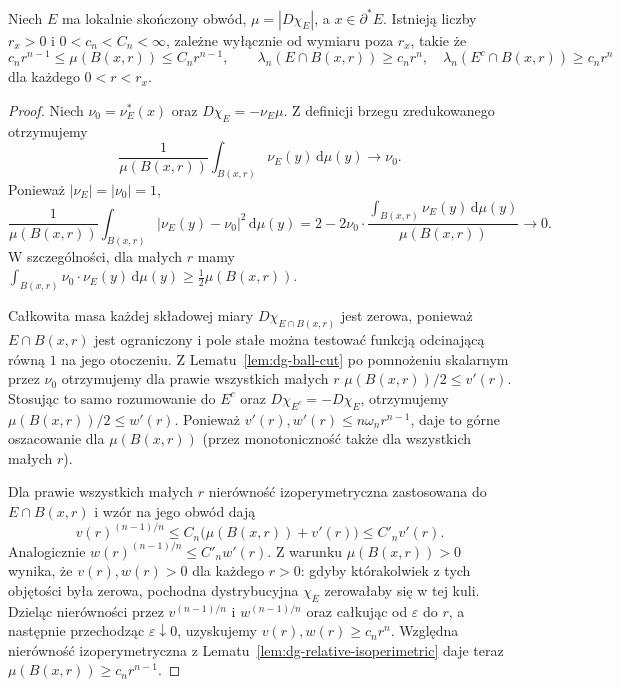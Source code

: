 \begin{lemat}
\label{lem:dg-density}
Niech $E$ ma lokalnie skończony obwód,
$\mu=|D\chi_E|$, a $x\in\partial^*E$.
Istnieją liczby $r_x>0$ i $0<c_n<C_n<\infty$,
zależne wyłącznie od wymiaru poza $r_x$, takie że
\[
 c_nr^{n-1}\le\mu(B(x,r))\le C_nr^{n-1},\qquad
 \lambda_n(E\cap B(x,r))\ge c_nr^n,\quad
 \lambda_n(E^c\cap B(x,r))\ge c_nr^n
\]
dla każdego $0<r<r_x$.
\end{lemat}
\begin{proof}
Niech $\nu_0=\nu_E^*(x)$ oraz
$D\chi_E=-\nu_E\mu$. Z definicji brzegu
zredukowanego otrzymujemy
\[
 \frac{1}{\mu(B(x,r))}\int_{B(x,r)}\nu_E(y)
 \,\mathrm d\mu(y)\longrightarrow\nu_0.
\]
Ponieważ $|\nu_E|=|\nu_0|=1$,
\[
 \frac1{\mu(B(x,r))}\int_{B(x,r)}
 |\nu_E(y)-\nu_0|^2\,\mathrm d\mu(y)
 =2-2\nu_0\cdot\frac{\int_{B(x,r)}\nu_E(y)\,\mathrm d\mu(y)}
 {\mu(B(x,r))}\longrightarrow0.
\]
W szczególności, dla małych $r$ mamy
$\int_{B(x,r)}\nu_0\cdot\nu_E(y)\,\mathrm d\mu(y)
\ge\frac12\mu(B(x,r))$.

Całkowita masa każdej składowej miary
$D\chi_{E\cap B(x,r)}$ jest zerowa, ponieważ
$E\cap B(x,r)$ jest ograniczony i pole stałe
można testować funkcją odcinającą równą $1$
na jego otoczeniu. Z Lematu~\ref{lem:dg-ball-cut}
po pomnożeniu skalarnym przez $\nu_0$ otrzymujemy
dla prawie wszystkich małych $r$
$\mu(B(x,r))/2\le v'(r)$.
Stosując to samo rozumowanie do $E^c$ oraz
$D\chi_{E^c}=-D\chi_E$, otrzymujemy
$\mu(B(x,r))/2\le w'(r)$.
Ponieważ $v'(r),w'(r)\le n\omega_n r^{n-1}$,
daje to górne oszacowanie dla $\mu(B(x,r))$
(przez monotoniczność także dla wszystkich
małych $r$).

Dla prawie wszystkich małych $r$ nierówność
izoperymetryczna zastosowana do $E\cap B(x,r)$
i wzór na jego obwód dają
\[
 v(r)^{(n-1)/n}\le C_n
 \bigl(\mu(B(x,r))+v'(r)\bigr)
 \le C'_n v'(r).
\]
Analogicznie $w(r)^{(n-1)/n}\le C'_nw'(r)$.
Z warunku $\mu(B(x,r))>0$ wynika, że
$v(r),w(r)>0$ dla każdego $r>0$:
gdyby którakolwiek z tych objętości była zerowa,
pochodna dystrybucyjna $\chi_E$ zerowałaby się
w tej kuli. Dzieląc nierówności przez
$v^{(n-1)/n}$ i $w^{(n-1)/n}$ oraz całkując
od $\varepsilon$ do $r$, a następnie przechodząc
$\varepsilon\downarrow0$, uzyskujemy
$v(r),w(r)\ge c_nr^n$.
Względna nierówność izoperymetryczna z
Lematu~\ref{lem:dg-relative-isoperimetric}
daje teraz $\mu(B(x,r))\ge c_nr^{n-1}$.
\end{proof}

